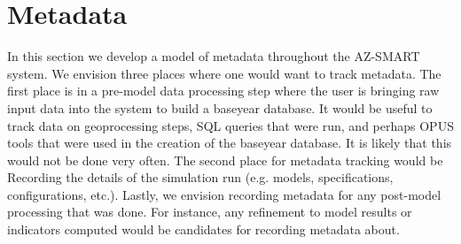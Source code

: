 \section{Metadata}

In this section we develop a model of metadata throughout the AZ-SMART system.  We envision three places where one would want to track metadata.  The first place is in a pre-model data processing step where the user is bringing raw input data into the system to build a baseyear database.  It would be useful to track data on geoprocessing steps, SQL queries that were run, and perhaps OPUS tools that were used in the creation of the baseyear database.  It is likely that this would not be done very often.  The second place for metadata tracking would be Recording the details of the simulation run (e.g. models, specifications, configurations, etc.).  Lastly, we envision recording metadata for any post-model processing that was done.  For instance, any refinement to model results or indicators computed would be candidates for recording metadata about.

